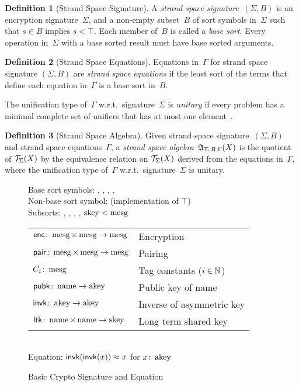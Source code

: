 \documentclass[12pt]{article}
\theoremstyle{definition}
\newtheorem{defn}{Definition}[section]
\begin{document}
\begin{defn}[Strand Space Signature]
A \emph{strand space signature}~$(\Sigma, B)$ is an encryption
signature~$\Sigma$, and a non-empty subset~$B$ of sort symbols
in~$\Sigma$ such that $s\in B$ implies $s<\top$.  Each member of~$B$
is called a \emph{base sort}.  Every operation in~$\Sigma$ with a base
sorted result must have base sorted arguments.
\end{defn}

\begin{defn}[Strand Space Equations]
Equations in~$\Gamma$ for strand space signature $(\Sigma,B)$ are
\emph{strand space equations} if the least sort of the terms that
define each equation in~$\Gamma$ is a base sort in~$B$.
\end{defn}

The unification type of~$\Gamma$
w.r.t.\ signature~$\Sigma$ is \emph{unitary} if every problem has a minimal complete set of unifiers that
has at most one element~\cite[Chapter~8,
  Section~3.1]{RobinsonVoronkov01}.

\begin{defn}[Strand Space Algebra]\label{def:algebra}
Given strand space signature~$(\Sigma,B)$ and strand space
equations~$\Gamma$, a \emph{strand space
  algebra}~$\mathfrak A_{\Sigma,B,\Gamma}(X)$ is the quotient of
$\mathcal{T}_\Sigma(X)$ by the equivalence relation on $\mathcal{T}_\Sigma(X)$
derived from the equations in~$\Gamma$, where the unification type
of~$\Gamma$ w.r.t.\ signature~$\Sigma$ is unitary.
\end{defn}

\begin{figure}
\begin{center}
Base sort symbols: , , , ,
\\
Non-base sort symbol:  (implementation of $\top$) \\[1ex]
Subsorts: , , , ,
$\operatorname{\mathrm{skey}}<\operatorname{\mathrm{mesg}}$\\[1ex]
\begin{tabular}{@{}ll}
$\operatorname{\mathsf{enc}}\colon\operatorname{\mathrm{mesg}}\times\operatorname{\mathrm{mesg}}\rightarrow\operatorname{\mathrm{mesg}}$
&Encryption\\
$\operatorname{\mathsf{pair}}\colon\operatorname{\mathrm{mesg}}\times\operatorname{\mathrm{mesg}}\rightarrow\operatorname{\mathrm{mesg}}$
&Pairing\\
$C_i\colon\operatorname{\mathrm{mesg}}$& Tag constants ($i\in\mathbb{N}$)\\
$\operatorname{\mathsf{pubk}}\colon\operatorname{\mathrm{name}}\rightarrow\operatorname{\mathrm{akey}}$
&Public key of name\\
$\operatorname{\mathsf{invk}}\colon\operatorname{\mathrm{akey}}\rightarrow\operatorname{\mathrm{akey}}$
&Inverse of asymmetric key\\
$\operatorname{\mathsf{ltk}}\colon\operatorname{\mathrm{name}}\times\operatorname{\mathrm{name}}\rightarrow\operatorname{\mathrm{skey}}$
& Long term shared key
\end{tabular}\\[1ex]
Equation: $\operatorname{\mathsf{invk}}(\operatorname{\mathsf{invk}}(x))\approx x$ for $x\colon\operatorname{\mathrm{akey}}$
\end{center}
\caption{Basic Crypto Signature and Equation}\label{fig:bcs}
\end{figure}
\end{document}
